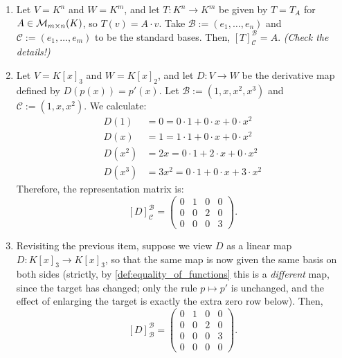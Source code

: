 \begin{example}
\label{ex:representation_matrices}
\begin{enumerate}
    \item  Let $V = K^n$ and $W = K^m$, and let $T: K^n \to K^m$ be given by $T = T_A$ for $A \in \mathcal{M}_{m \times n}(K)$, so $T(v) = A \cdot v$. Take $\mathcal{B} := (e_1, \dots, e_n)$ and $\mathcal{C} := (e_1, \dots, e_m)$ to be the standard bases. Then, $[T]_{\mathcal{C}}^{\mathcal{B}} = A$. \textit{(Check the details!)}
    \item  Let $V = K[x]_3$ and $W = K[x]_2$, and let $D: V \to W$ be the derivative map defined by $D(p(x)) = p'(x)$. Let $\mathcal{B} := (1, x, x^2, x^3)$ and $\mathcal{C} := (1, x, x^2)$. We calculate:
    \begin{align*}
    D(1) &= 0 = 0 \cdot 1 + 0 \cdot x + 0 \cdot x^2 \\
    D(x) &= 1 = 1 \cdot 1 + 0 \cdot x + 0 \cdot x^2 \\
    D(x^2) &= 2x = 0 \cdot 1 + 2 \cdot x + 0 \cdot x^2 \\
    D(x^3) &= 3x^2 = 0 \cdot 1 + 0 \cdot x + 3 \cdot x^2
    \end{align*}
    Therefore, the representation matrix is:
    \[
    [D]_{\mathcal{C}}^{\mathcal{B}} = 
    \begin{pmatrix}
    0 & 1 & 0 & 0 \\
    0 & 0 & 2 & 0 \\
    0 & 0 & 0 & 3
    \end{pmatrix}.
    \]
    \item  Revisiting the previous item, suppose we view $D$ as a linear map $D: K[x]_3 \to K[x]_3$, so that the same map is now given the same basis on both sides (strictly, by \cref{def:equality_of_functions} this is a \emph{different} map, since the target has changed; only the rule $p \mapsto p'$ is unchanged, and the effect of enlarging the target is exactly the extra zero row below). Then,
    \[
    [D]_{\mathcal{B}}^{\mathcal{B}} = 
    \begin{pmatrix}
    0 & 1 & 0 & 0 \\
    0 & 0 & 2 & 0 \\
    0 & 0 & 0 & 3 \\
    0 & 0 & 0 & 0
    \end{pmatrix}.
    \]
\end{enumerate}
\end{example}

